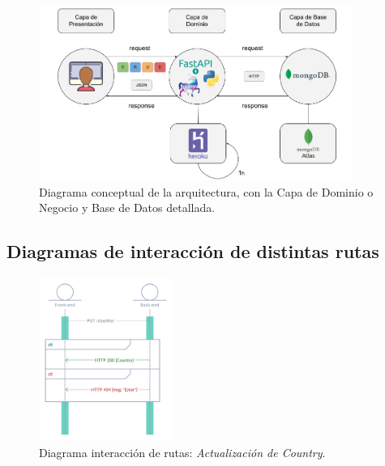 \vspace{0.3cm}

\begin{figure}[H]
    \centering
    \myfloatalign
    \includegraphics[width=0.91\textwidth]{gfx/DiagramaRutas2.png}
    \caption[Diagrama conceptual con más detalle (2)]{Diagrama conceptual de la arquitectura, con la Capa de Dominio o Negocio y Base de Datos detallada.}\label{gfx:DiagramaRutas2}
\end{figure}

\subsection{Diagramas de interacción de distintas rutas}

\begin{figure}[H]
    \centering
    \myfloatalign
    \includegraphics[width=0.39\textwidth]{gfx/diagrama-itr1.png}
    \caption[Diagrama interacción de rutas (1)]{Diagrama interacción de rutas: \textit{Actualización de Country}.}\label{gfx:diagrama-itr1}
\end{figure}


